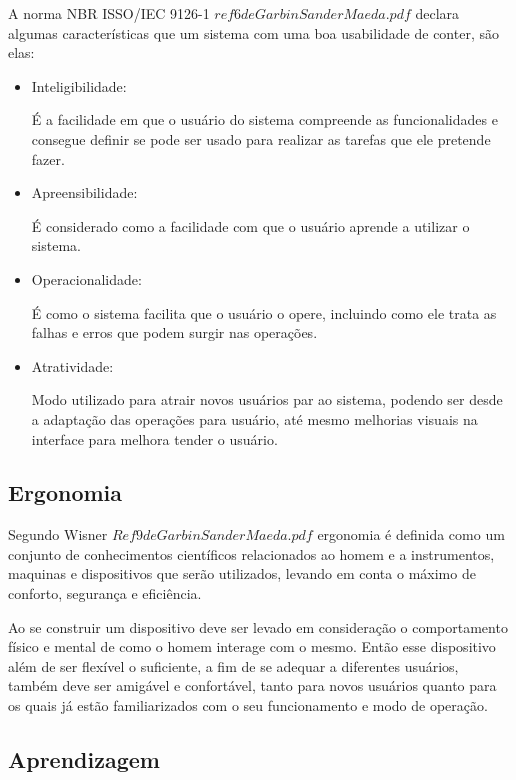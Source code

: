 \documentclass[
	12pt,			%
	openright,		%
	oneside,			%
	a4paper,			%
	chapter=TITLE,		%
	english,			%
	brazil,			%
	]{abntex2}
\begin{document}
A norma NBR ISSO/IEC 9126-1 \(ref 6 de Garbin Sander Maeda.pdf\) declara algumas características que um sistema com uma boa usabilidade de conter, são elas:

\begin{itemize}
	\item Inteligibilidade:

É a facilidade em que o usuário do sistema compreende as funcionalidades e consegue definir se pode ser usado para realizar as tarefas que ele pretende fazer.

\item Apreensibilidade:

É considerado como a facilidade com que o usuário aprende a utilizar o sistema.

\item Operacionalidade:

É como o sistema facilita que o usuário o opere, incluindo como ele trata as falhas e erros que podem surgir nas operações.

\item Atratividade:

Modo utilizado para atrair novos usuários par ao sistema, podendo ser desde a adaptação das operações para usuário, até mesmo melhorias visuais na interface para melhora tender o usuário.

\end{itemize}

\subsection{Ergonomia}

Segundo Wisner \(Ref 9 de Garbin Sander Maeda.pdf\) ergonomia é definida como um conjunto de conhecimentos científicos relacionados ao homem e a instrumentos, maquinas e dispositivos que serão utilizados, levando em conta o máximo de conforto, segurança e eficiência.

Ao se construir um dispositivo deve ser levado em consideração o comportamento físico e mental de como o homem interage com o mesmo. Então esse dispositivo além de ser flexível o suficiente, a fim de se adequar a diferentes usuários, também deve ser amigável e confortável, tanto para novos usuários quanto para os quais já estão familiarizados com o seu funcionamento e modo de operação.

\subsection{Aprendizagem}
\end{document}

